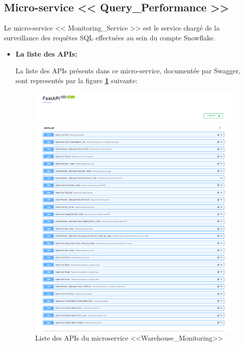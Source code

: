 \subsection{Micro-service << Query\_Performance >>}
\par Le micro-service << Monitoring\_Service >> est le service chargé de la surveillance des requêtes SQL effectuées au sein du compte Snowflake.
\begin{itemize}
    \item \textbf{La liste des APIs:}
        \par La liste des APIs présents dans ce micro-service, documentée par Swagger, sont representés par la figure \textbf{\ref{fig:apiquery}} suivante:
        \begin{figure}[H]
            \centering
            \includegraphics[width =1\linewidth]{img/captures/queries_apis.PNG}
            \caption{Liste des APIs du microservice <<Warehouse\_Monitoring>> }
                \label{fig:apiquery}
        \end{figure}


\end{itemize}
